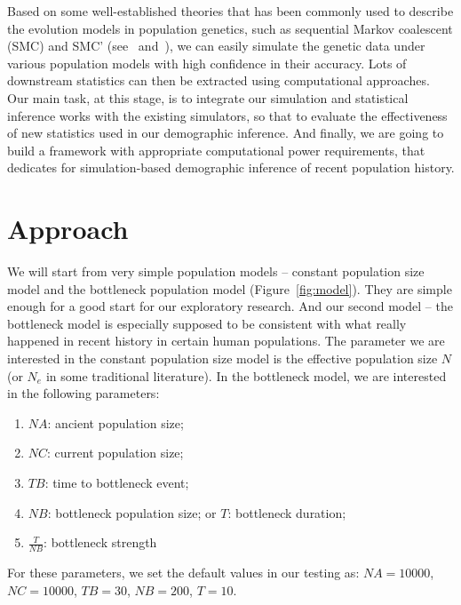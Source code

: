 \documentclass{bioinfo}
\begin{document}
Based on some well-established theories that has been commonly used to describe the evolution models in population genetics, such as sequential Markov coalescent (SMC) and SMC' (see~\cite{McVean2005} and~\cite{Marjoram2006}), we can easily simulate the genetic data under various population models with high confidence in their accuracy. Lots of downstream statistics can then be extracted using computational approaches. Our main task, at this stage, is to integrate our simulation and statistical inference works with the existing simulators, so that to evaluate the effectiveness of new statistics used in our demographic inference. And finally, we are going to build a framework with appropriate computational power requirements, that dedicates for simulation-based demographic inference of recent population history.





\section{Approach}

We will start from very simple population models -- constant population size model and the bottleneck population model (Figure~\ref{fig:model}). They are simple enough for a good start for our exploratory research. And our second model -- the bottleneck model is especially supposed to be consistent with what really happened in recent history in certain human populations. The parameter we are interested in the constant population size model is the effective population size $N$ (or $N_{e}$ in some traditional literature). In the bottleneck model, we are interested in the following parameters:

\begin{enumerate}
\item $NA$: ancient population size;
\item $NC$: current population size;
\item $TB$: time to bottleneck event;
\item $NB$: bottleneck population size; or $T$: bottleneck duration;
\item $\frac{T}{NB}$: bottleneck strength
\end{enumerate}

For these parameters, we set the default values in our testing as: $NA=10000$, $NC=10000$, $TB=30$, $NB=200$, $T=10$.
\end{document}
